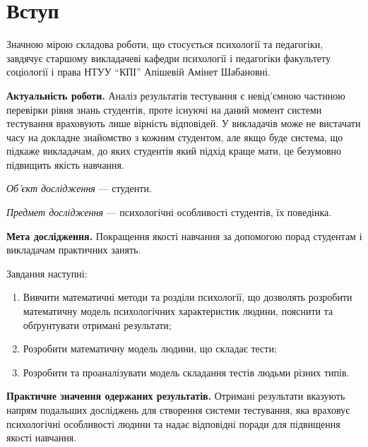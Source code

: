 \chapter*{Вступ}

\totalfigures

Значною мірою складова роботи, що стосується психології та педагогіки, завдячує
старшому викладачеві кафедри психології і педагогіки
факультету соціології і права НТУУ ``КПІ'' Апішевій Амінет Шабановні.

\textbf{Актуальність роботи.}
Аналіз результатів тестування є невід’ємною частиною перевірки рівня знань
студентів, проте існуючі на даний момент системи тестування враховують
лише вірність відповідей.
У викладачів може не вистачати часу на докладне знайомство з кожним студентом,
але якщо буде система, що підкаже викладачам, до яких
студентів який підхід краще мати, це безумовно підвищить якість навчання.

\textit{Об’єкт дослідження} ---
студенти.

\textit{Предмет дослідження} ---
психологічні особливості студентів, їх поведінка.

\textbf{Мета дослідження.}
Покращення якості навчання за допомогою порад студентам і викладачам
практичних занять.

Завдання наступні:
\begin{enumerate}
  \item
    Вивчити математичні методи та розділи психології, що дозволять розробити
    математичну модель психологічних характеристик людини,
    пояснити та обґрунтувати отримані результати;
  \item
    Розробити математичну модель людини, що складає тести;
  \item
    Розробити та проаналізувати модель складання тестів людьми різних типів.
\end{enumerate}

\textbf{Практичне значення одержаних результатів.}
Отримані результати
вказують напрям подальших досліджень для створення системи тестування,
яка враховує психологічні особливості людини та надає відповідні поради
для підвищення якості навчання.

